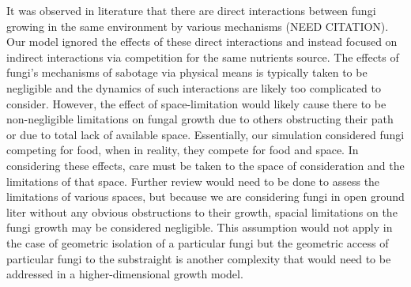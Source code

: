 \documentclass[10pt]{article}
\begin{document}
It was observed in literature that there are direct interactions between fungi growing in the same environment by various mechanisms (NEED CITATION). Our model ignored the effects of these direct interactions and instead focused on indirect interactions via competition for the same nutrients source. The effects of fungi's mechanisms of sabotage via physical means is typically taken to be negligible and the dynamics of such interactions are likely too complicated to consider. However, the effect of space-limitation would likely cause there to be non-negligible limitations on fungal growth due to others obstructing their path or due to total lack of available space. Essentially, our simulation considered fungi competing for food, when in reality, they compete for food and space. In considering these effects, care must be taken to the space of consideration and the limitations of that space. Further review would need to be done to assess the limitations of various spaces, but because we are considering fungi in open ground liter without any obvious obstructions to their growth, spacial limitations on the fungi growth may be considered negligible. This assumption would not apply in the case of geometric isolation of a particular fungi but the geometric access of particular fungi to the substraight is another complexity that would need to be addressed in a higher-dimensional growth model. 
\end{document}
